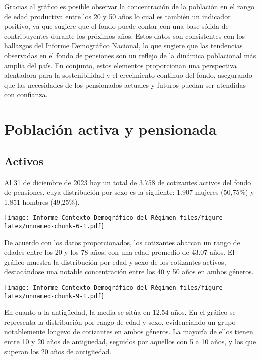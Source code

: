 \documentclass[
]{article}
\begin{document}
Gracias al gráfico es posible observar la concentración de la población
en el rango de edad productiva entre los 20 y 50 años lo cual es también
un indicador positivo, ya que sugiere que el fondo puede contar con una
base sólida de contribuyentes durante los próximos años. Estos datos son
consistentes con los hallazgos del Informe Demográfico Nacional, lo que
sugiere que las tendencias observadas en el fondo de pensiones son un
reflejo de la dinámica poblacional más amplia del país. En conjunto,
estos elementos proporcionan una perspectiva alentadora para la
sostenibilidad y el crecimiento continuo del fondo, asegurando que las
necesidades de los pensionados actuales y futuros puedan ser atendidas
con confianza.

\hypertarget{poblaciuxf3n-activa-y-pensionada}{%
\section{Población activa y
pensionada}\label{poblaciuxf3n-activa-y-pensionada}}

\hypertarget{activos}{%
\subsection{Activos}\label{activos}}

Al 31 de diciembre de 2023 hay un total de 3.758 de cotizantes activos
del fondo de pensiones, cuya distribución por sexo es la siguiente:
1.907 mujeres (50,75\%) y 1.851 hombres (49,25\%).

\texttt{[image: Informe-Contexto-Demográfico-del-Régimen\_files/figure-latex/unnamed-chunk-6-1.pdf]}

De acuerdo con los datos proporcionados, los cotizantes abarcan un rango
de edades entre los 20 y los 78 años, con una edad promedio de 43.07
años. El gráfico muestra la distribución por edad y sexo de los
cotizantes activos, destacándose una notable concentración entre los 40
y 50 años en ambos géneros.

\texttt{[image: Informe-Contexto-Demográfico-del-Régimen\_files/figure-latex/unnamed-chunk-9-1.pdf]}

En cuanto a la antigüedad, la media se sitúa en 12.54 años. En el
gráfico se representa la distribución por rango de edad y sexo,
evidenciando un grupo notablemente longevo de cotizantes en ambos
géneros. La mayoría de ellos tienen entre 10 y 20 años de antigüedad,
seguidos por aquellos con 5 a 10 años, y los que superan los 20 años de
antigüedad.
\end{document}
